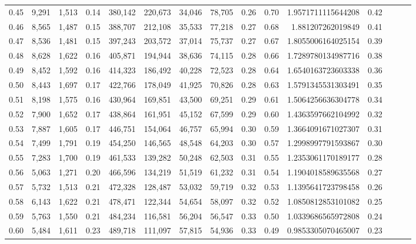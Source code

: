 \begin{tabular}{rrrrrrrrrrrrrrr}
0.45 &   9,291 &  1,513 &  0.14 &  380,142 &  220,673 &   34,046 &   78,705 &  0.26 &  0.70 &    1.9571711115644208 &      0.42 \\
0.46 &   8,565 &  1,487 &  0.15 &  388,707 &  212,108 &   35,533 &   77,218 &  0.27 &  0.68 &     1.881207262019849 &      0.41 \\
0.47 &   8,536 &  1,481 &  0.15 &  397,243 &  203,572 &   37,014 &   75,737 &  0.27 &  0.67 &    1.8055006164025154 &      0.39 \\
0.48 &   8,628 &  1,622 &  0.16 &  405,871 &  194,944 &   38,636 &   74,115 &  0.28 &  0.66 &    1.7289780134987716 &      0.38 \\
0.49 &   8,452 &  1,592 &  0.16 &  414,323 &  186,492 &   40,228 &   72,523 &  0.28 &  0.64 &    1.6540163723603338 &      0.36 \\
0.50 &   8,443 &  1,697 &  0.17 &  422,766 &  178,049 &   41,925 &   70,826 &  0.28 &  0.63 &    1.5791345531303491 &      0.35 \\
0.51 &   8,198 &  1,575 &  0.16 &  430,964 &  169,851 &   43,500 &   69,251 &  0.29 &  0.61 &    1.5064256636304778 &      0.34 \\
0.52 &   7,900 &  1,652 &  0.17 &  438,864 &  161,951 &   45,152 &   67,599 &  0.29 &  0.60 &    1.4363597662104992 &      0.32 \\
0.53 &   7,887 &  1,605 &  0.17 &  446,751 &  154,064 &   46,757 &   65,994 &  0.30 &  0.59 &    1.3664091671027307 &      0.31 \\
0.54 &   7,499 &  1,791 &  0.19 &  454,250 &  146,565 &   48,548 &   64,203 &  0.30 &  0.57 &    1.2998997791593867 &      0.30 \\
0.55 &   7,283 &  1,700 &  0.19 &  461,533 &  139,282 &   50,248 &   62,503 &  0.31 &  0.55 &    1.2353061170189177 &      0.28 \\
0.56 &   5,063 &  1,271 &  0.20 &  466,596 &  134,219 &   51,519 &   61,232 &  0.31 &  0.54 &    1.1904018589635568 &      0.27 \\
0.57 &   5,732 &  1,513 &  0.21 &  472,328 &  128,487 &   53,032 &   59,719 &  0.32 &  0.53 &    1.1395641723798458 &      0.26 \\
0.58 &   6,143 &  1,622 &  0.21 &  478,471 &  122,344 &   54,654 &   58,097 &  0.32 &  0.52 &    1.0850812853101082 &      0.25 \\
0.59 &   5,763 &  1,550 &  0.21 &  484,234 &  116,581 &   56,204 &   56,547 &  0.33 &  0.50 &    1.0339686565972808 &      0.24 \\
0.60 &   5,484 &  1,611 &  0.23 &  489,718 &  111,097 &   57,815 &   54,936 &  0.33 &  0.49 &    0.9853305070465007 &      0.23 \\

\end{tabular}
